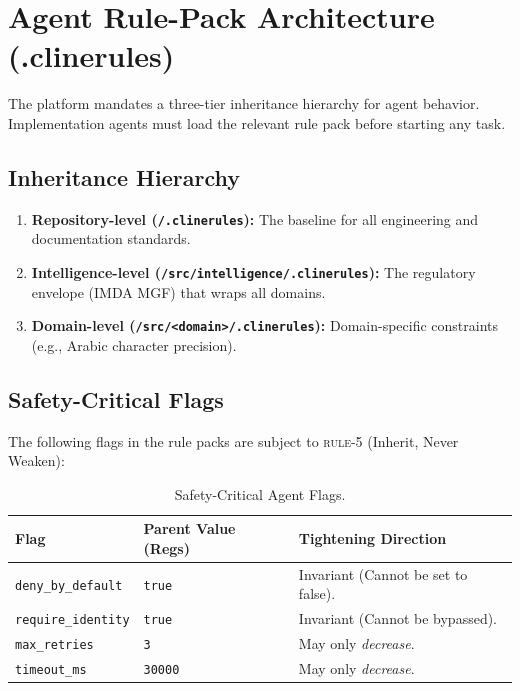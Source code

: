 \documentclass[11pt,a4paper,twoside]{report}
\begin{document}
\section{Agent Rule-Pack Architecture (.clinerules)}
\label{sec:agent-rule-packs}

The platform mandates a three-tier inheritance hierarchy for agent behavior. Implementation agents must load the relevant rule pack before starting any task.

\subsection{Inheritance Hierarchy}
\begin{enumerate}
\item \textbf{Repository-level (\texttt{/.clinerules}):} The baseline for all engineering and documentation standards.
\item \textbf{Intelligence-level (\texttt{/src/intelligence/.clinerules}):} The regulatory envelope (IMDA MGF) that wraps all domains.
\item \textbf{Domain-level (\texttt{/src/<domain>/.clinerules}):} Domain-specific constraints (e.g., Arabic character precision).
\end{enumerate}

\subsection{Safety-Critical Flags}
The following flags in the rule packs are subject to \textsc{rule-5} (Inherit, Never Weaken):
\begin{table}[htbp]
\centering
\footnotesize
\caption{Safety-Critical Agent Flags.}
\label{tab:safety-flags}
\begin{tabularx}{\textwidth}{@{}l X X@{}}
\toprule
\textbf{Flag} & \textbf{Parent Value (Regs)} & \textbf{Tightening Direction} \\
\midrule
\texttt{deny\_by\_default} & \texttt{true} & Invariant (Cannot be set to false). \\
\texttt{require\_identity} & \texttt{true} & Invariant (Cannot be bypassed). \\
\texttt{max\_retries} & \texttt{3} & May only \emph{decrease}. \\
\texttt{timeout\_ms} & \texttt{30000} & May only \emph{decrease}. \\
\bottomrule
\end{tabularx}
\end{table}
\end{document}
